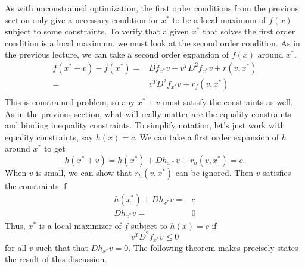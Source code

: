 \documentclass[12pt,reqno]{amsart}
\theoremstyle{definition}
\begin{document}
As with unconstrained optimization, the first order conditions from
the previous section only give a necessary condition for $x^*$ to be a
local maximum of $f(x)$ subject to some constraints. To verify that a
given $x^*$ that solves the first order condition is a local maximum,
we must look at the second order condition. As in the previous
lecture, we can take a second order expansion of $f(x)$ around $x^*$. 
\begin{align*}
  f(x^*+v) - f(x^*) = & Df_{x^*} v + v^T D^2 f_{x^*}
  v + r(v,x^*) \\
  = & v^T D^2 f_{x^*} v + r_f(v,x^*) \\
\end{align*}
This is constrained problem, so any $x^* + v$ must satisfy the
constraints as well. As in the previous section, what will really
matter are the equality constraints and binding inequality
constraints. To simplify notation, let's just work with equality
constraints, say $h(x)=c$. We can take a first order expansion of $h$
around $x^*$ to get
\[ h(x^* + v) = h(x^*) + Dh_{x*} v + r_h(v,x^*) = c. \]
When $v$ is small, we can show that $r_h(v,x^*)$ can be
ignored. Then $v$ satisfies the constraints if
\begin{align*}
  h(x^*) + Dh_{x^*} v = & c \\
  Dh_{x^*} v = & 0
\end{align*}
Thus, $x^*$ is a local maximizer of $f$ subject to $h(x) = c$ if
\[ v^T D^2 f_{x^*} v \leq 0 \]
for all $v$ such that that $Dh_{x^*} v = 0$. The following
theorem makes precisely states the result of this discussion.
\end{document}
